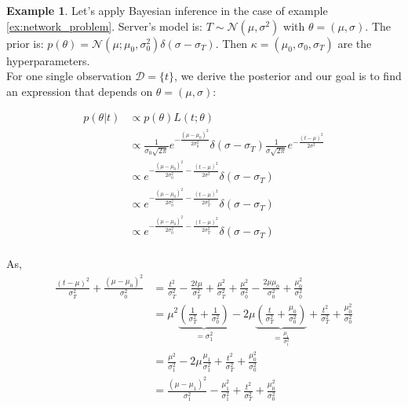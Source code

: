 \documentclass[12pt, a4paper]{article}
\theoremstyle{definition}
\newtheorem{example}{Example}[section]
\numberwithin{figure}{section}
\numberwithin{equation}{section}
\numberwithin{table}{section}
\begin{document}
\begin{example}
Let's apply Bayesian inference in the case of example \ref{ex:network_problem}. Server's model is: $T \sim \mathcal{N}(\mu,\sigma^2)$ with $\theta=(\mu, \sigma)$. The prior is: $p(\theta) = \mathcal{N}(\mu; \mu_0, \sigma_0^2) \delta(\sigma - \sigma_T)$. Then $\kappa=(\mu_0,\sigma_0,\sigma_T)$ are the hyperparameters.\\

For one single observation $\mathcal{D}=\{t\}$, we derive the posterior and our goal is to find an expression that depends on $\theta=(\mu,\sigma)$:

\begin{align}
p(\theta | t) 
&\propto p(\theta) L(t; \theta)\\
&\propto \frac{1}{\sigma_0\sqrt{2 \pi}}e^{-\frac{(\mu-\mu_0)^2}{2 \sigma_0^2}}\delta(\sigma - \sigma_T)\frac{1}{\sigma \sqrt{2 \pi}}e^{-\frac{(t-\mu)^2}{2 \sigma^2}}\\
&\propto e^{-\frac{(\mu-\mu_0)^2}{2 \sigma_0^2}-\frac{(t-\mu)^2}{2 \sigma^2}}\delta(\sigma - \sigma_T)\\
&\propto e^{-\frac{(\mu-\mu_0)^2}{2 \sigma_0^2}-\frac{(t-\mu)^2}{2 \sigma_T^2}}\delta(\sigma - \sigma_T)\\
&\propto e^{-\frac{(\mu-\mu_0)^2}{2 \sigma_0^2}-\frac{(t-\mu)^2}{2 \sigma_T^2}}\delta(\sigma - \sigma_T)\\
\end{align}

As,
\begin{align}
\frac{(t - \mu)^2}{\sigma_T^2} + \frac{(\mu - \mu_0)^2}{\sigma_0^2}
&=\frac{t^2}{\sigma_T^2} - \frac{2t\mu}{\sigma_T^2} + \frac{\mu^2}{\sigma_T^2} + \frac{\mu^2}{\sigma_0^2} - \frac{2 \mu \mu_0}{\sigma_0^2} + \frac{\mu_0^2}{\sigma_0^2}\\
    &= \mu^2 \underbrace{\left( \frac{1}{\sigma_T^2} + \frac{1}{\sigma_0^2} \right)}_{=\sigma_1^2} - 2\mu \underbrace{\left( \frac{t}{\sigma_T^2} + \frac{\mu_0}{\sigma_0^2} \right)}_{=\frac{\mu_1}{\sigma_1^2}} + \frac{t^2}{\sigma_T^2} + \frac{\mu_0^2}{\sigma_0^2}\\
&=\frac{\mu^2}{\sigma_1^2} - 2\mu \frac{\mu_1}{\sigma_1^2} + \frac{t^2}{\sigma_T^2} + \frac{\mu_0^2}{\sigma_0^2}\\
&= \frac{(\mu - \mu_1)^2}{\sigma_1^2} - \frac{\mu_1^2}{\sigma_1^2} + \frac{t^2}{\sigma_T^2} + \frac{\mu_0^2}{\sigma_0^2}
\end{align}


\end{example}
\end{document}

